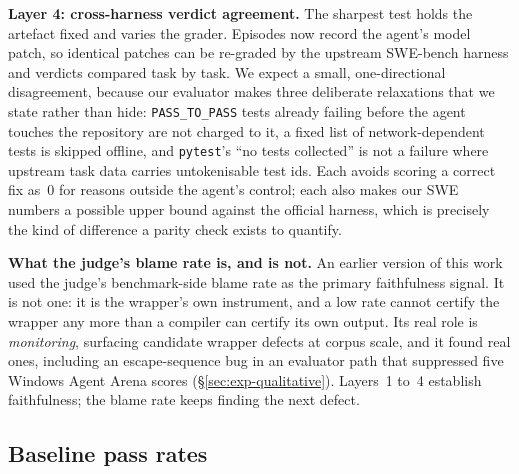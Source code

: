 \documentclass{article}
\newcommand{\mypar}[1]{\par\noindent\textbf{#1}\enspace}
\begin{document}
\mypar{Layer 4: cross-harness verdict agreement.}
The sharpest test holds the artefact fixed and varies the grader. Episodes now
record the agent's model patch, so identical patches can be re-graded by the
upstream SWE-bench harness and verdicts compared task by task. We expect a
small, one-directional disagreement, because our evaluator makes three
deliberate relaxations that we state rather than hide: \texttt{PASS\_TO\_PASS}
tests already failing before the agent touches the repository are not charged
to it, a fixed list of network-dependent tests is skipped offline, and
\texttt{pytest}'s ``no tests collected'' is not a failure where upstream task
data carries untokenisable test ids. Each avoids scoring a correct fix as~0 for
reasons outside the agent's control; each also makes our SWE numbers a possible
upper bound against the official harness, which is precisely the kind of
difference a parity check exists to quantify.

\mypar{What the judge's blame rate is, and is not.}
An earlier version of this work used the judge's benchmark-side blame rate as
the primary faithfulness signal. It is not one: it is the wrapper's own
instrument, and a low rate cannot certify the wrapper any more than a compiler
can certify its own output. Its real role is \emph{monitoring}, surfacing
candidate wrapper defects at corpus scale, and it found real ones, including an
escape-sequence bug in an evaluator path that suppressed five Windows Agent
Arena scores (\S\ref{sec:exp-qualitative}). Layers~1 to~4 establish
faithfulness; the blame rate keeps finding the next defect.


\subsection{Baseline pass rates}
\label{sec:exp-baselines}
\end{document}

